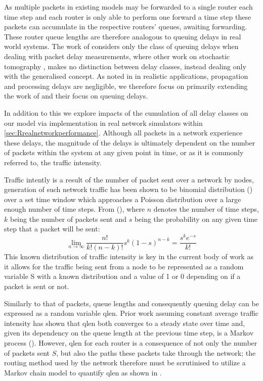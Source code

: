 As multiple packets in existing models may be forwarded to a single router each time step and each router is only able to perform one forward a time step these packets can accumulate in the respective routers’ queues, awaiting forwarding. These router queue lengths are therefore analogous to queuing delays in real world systems. The work of \cite{barnes_stochastic_2020} considers only the class of queuing delays when dealing with packet delay measurements, where other work on stochastic tomography \cite{kolar_distributed_2020}, \cite{he_fisher_2015} makes no distinction between delay classes, instead dealing only with the generalised concept. As noted in \cite{telchemy_impact_2006} in realistic applications, propagation and processing delays are negligible, we therefore focus on primarily extending the work of \cite{barnes_stochastic_2020} and their focus on queuing delays.\par
In addition to this we explore impacts of the cumulation of all delay classes on our model via implementation in real network simulators within \cref{sec:Rrealnetworkperformance}. Although all packets in a network experience these delays, the magnitude of the delays is ultimately dependent on the number of packets within the system at any given point in time, or as it is commonly referred to, the traffic intensity.\par
Traffic intently is a result of the number of packet sent over a network by nodes, generation of such network traffic has been shown to be binomial distribution (\cite{barnes_stochastic_2020}) over a set time window which approaches a Poisson distribution over a large enough number of time steps. From (\cite{barnes_stochastic_2020}), where $n$ denotes the number of time steps, $k$ being the number of packets sent and $s$ being the probability on any given time step that a packet will be sent:
\[\lim_{n\to\infty} \frac{n!}{k!(n-k)!}s^k (1-s)^{n-k} =\frac{s^k e^{-s}}{k!}\]
This known distribution of traffic intensity is key in the current body of work as it allows for the traffic being sent from a node to be represented as a random variable S with a known distribution and a value of 1 or 0 depending on if a packet is sent or not. \par
Similarly to that of packets, queue lengths and consequently queuing delay can be expressed as a random variable \gls{qlen}. Prior work assuming constant average traffic intensity has shown that \gls{qlen} both converges to a steady state over time and, given its dependency on the queue length at the previous time step, is a Markov process (\cite{barnes_stochastic_2020}). However, \gls{qlen} for each router is a consequence of not only the number of packets sent $S$, but also the paths these packets take through the network; the routing method used by the network therefore must be scrutinised to utilize a Markov chain model to quantify \gls{qlen} as shown in \cite{barnes_stochastic_2020}.\par
